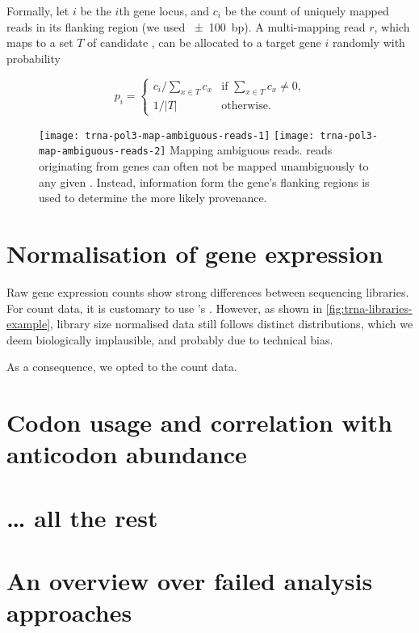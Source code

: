 Formally, let \(i\) be the \(i\)th \trna gene locus, and \(c_i\) be the count of
uniquely mapped reads in its flanking region (we used \SI{\pm100}{bp}). A
multi-mapping read \(r\), which maps to a set \(T\) of candidate \trna[s], can
be allocated to a target \trna gene \(i\) randomly with probability

\begin{equation}
    p_i = \begin{cases}
        {c_i}/{\sum_{x \in T}c_x} & \text{if \(\sum_{x \in T}c_x \neq 0\),} \\
        {1}/{\vert T \rvert} & \text{otherwise.}
    \end{cases}
\end{equation}

\begin{figure}[h]
    \centering
    \begingroup
        \texttt{[image: trna-pol3-map-ambiguous-reads-1]}
    \endgroup
    \begingroup
        \texttt{[image: trna-pol3-map-ambiguous-reads-2]}
    \endgroup
        {Mapping ambiguous \chip reads.}
        {\chip reads originating from \trna genes can often not be mapped
        unambiguously to any given \trna. Instead, information form the gene’s
        flanking regions is used to determine the more likely provenance.}
\end{figure}

\section{Normalisation of \trna gene expression}

Raw \trna gene expression counts show strong differences between sequencing
libraries. For \mrna count data, it is customary to use ’s
 \citep{Anders:2010}. However, as shown in
\cref{fig:trna-libraries-example}, library size normalised data still follows
distinct distributions, which we deem biologically implausible, and probably due
to technical bias.

As a consequence, we opted to  the count data.


\section{Codon usage and correlation with anticodon abundance}

\section{… all the rest}

\section{An overview over failed analysis approaches}
